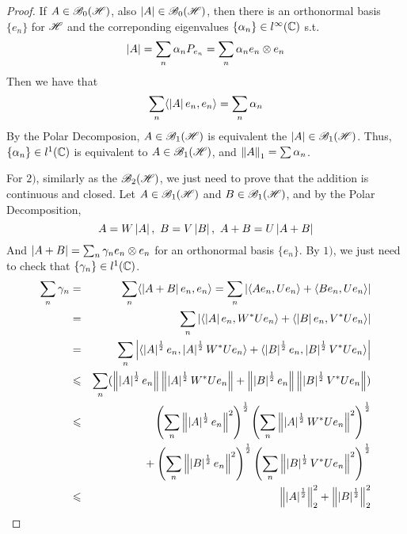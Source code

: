 \begin{proof}
	If $A \in \mathscr{B}_{0}\mathscr{(H)}$, also $\left\lvert A\right\lvert \in \mathscr{B}_{0}\mathscr{(H)}$, then there is an orthonormal basis $\{e_n\}$ for $\mathscr{H}$ and the correponding eigenvalues $\{\alpha_n\} \in l^{\infty}(\mathbb{C})$ s.t.
	\begin{equation*}
		\left\lvert A\right\lvert = \sum_{n} \alpha_n P_{e_n} = \sum_{n} \alpha_n e_n \otimes e_n
	\end{equation*}
	Then we have that
	\begin{equation*}
		\sum_n \langle \left\lvert A\right\lvert e_n, e_n \rangle = \sum_n \alpha_n
	\end{equation*}
	By the Polar Decomposion, $A \in \mathscr{B}_{1}\mathscr{(H)}$ is equivalent the $\left\lvert A\right\lvert \in \mathscr{B}_{1}\mathscr{(H)}$. Thus, $\{\alpha_n\} \in l^{1}(\mathbb{C})$ is equivalent to $A \in \mathscr{B}_{1}\mathscr{(H)}$, and $\left\lVert A\right\lVert_1 = \sum \alpha_n$.
	\item For $2)$, similarly as the $\mathscr{B}_{2}\mathscr{(H)}$, we just need to prove that the addition is continuous and closed. Let $A \in \mathscr{B}_{1}\mathscr{(H)}$ and $B \in \mathscr{B}_{1}\mathscr{(H)}$, and by the Polar Decomposition,
	\begin{equation*}
		A = W\left\lvert A\right\lvert,~ B = V \left\lvert B\right\lvert,~ A+B = U\left\lvert A+B\right\lvert
	\end{equation*}
	And $\left\lvert A+B\right\lvert = \sum_{n} \gamma_n e_n \otimes e_n$ for an orthonormal basis $\{e_n\}$. By $1)$, we just need to check that $\{\gamma_n\} \in l^{1}(\mathbb{C})$.
	\begin{eqnarray*}
		\sum_n \gamma_n &=& \sum_n \langle \abs{A+B}e_n,e_n \rangle = \sum_n \abs{\langle Ae_n, Ue_n \rangle + \langle Be_n, Ue_n \rangle} \\
		&=& \sum_n \abs{\langle \abs{A}e_n, \st{W}Ue_n \rangle + \langle \abs{B}e_n, \st{V}Ue_n \rangle} \\
		&=& \sum_n \abs{\langle \abs{A}^{\frac{1}{2}}e_n, \abs{A}^{\frac{1}{2}}\st{W}Ue_n \rangle + \langle \abs{B}^{\frac{1}{2}}e_n, \abs{B}^{\frac{1}{2}}\st{V}Ue_n \rangle} \\
		&\leqslant& \sum_n (\norm{\abs{A}^{\frac{1}{2}}e_n}\norm{\abs{A}^{\frac{1}{2}}\st{W}Ue_n}+\norm{\abs{B}^{\frac{1}{2}}e_n}\norm{\abs{B}^{\frac{1}{2}}\st{V}Ue_n}) \\
		&\leqslant& \left(\sum_n \norm{\abs{A}^{\frac{1}{2}}e_n}^2 \right)^{\frac{1}{2}}\left(\sum_n \norm{\abs{A}^{\frac{1}{2}}\st{W}Ue_n}^2 \right)^{\frac{1}{2}} \\
		&& \negmedspace{} + \left(\sum_n \norm{\abs{B}^{\frac{1}{2}}e_n}^2 \right)^{\frac{1}{2}}\left(\sum_n \norm{\abs{B}^{\frac{1}{2}}\st{V}Ue_n}^2 \right)^{\frac{1}{2}} \\
		&\leqslant& \norm{\abs{A}^{\frac{1}{2}}}_2^2 + \norm{\abs{B}^{\frac{1}{2}}}_2^2 \\

\end{eqnarray*}
\end{proof}
